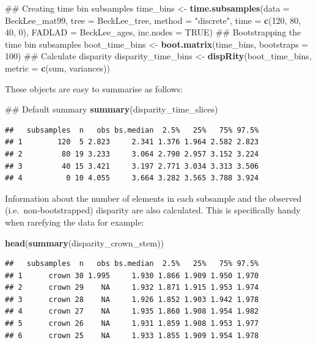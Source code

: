 \documentclass[]{book}
\newenvironment{Shaded}{\begin{snugshade}}{\end{snugshade}}
\newcommand{\KeywordTok}[1]{\textcolor[rgb]{0.13,0.29,0.53}{\textbf{#1}}}
\newcommand{\DataTypeTok}[1]{\textcolor[rgb]{0.13,0.29,0.53}{#1}}
\newcommand{\DecValTok}[1]{\textcolor[rgb]{0.00,0.00,0.81}{#1}}
\newcommand{\StringTok}[1]{\textcolor[rgb]{0.31,0.60,0.02}{#1}}
\newcommand{\OtherTok}[1]{\textcolor[rgb]{0.56,0.35,0.01}{#1}}
\newcommand{\NormalTok}[1]{#1}
\theoremstyle{definition}
\theoremstyle{definition}
\theoremstyle{remark}
\begin{document}
\begin{Shaded}
\begin{Highlighting}[]
\NormalTok{## Creating time bin subsamples}
\NormalTok{time_bins <-}\StringTok{ }\KeywordTok{time.subsamples}\NormalTok{(}\DataTypeTok{data =}\NormalTok{ BeckLee_mat99, }\DataTypeTok{tree =}\NormalTok{ BeckLee_tree, }
    \DataTypeTok{method =} \StringTok{"discrete"}\NormalTok{, }\DataTypeTok{time =} \KeywordTok{c}\NormalTok{(}\DecValTok{120}\NormalTok{, }\DecValTok{80}\NormalTok{, }\DecValTok{40}\NormalTok{, }\DecValTok{0}\NormalTok{), }\DataTypeTok{FADLAD =}\NormalTok{ BeckLee_ages,}
    \DataTypeTok{inc.nodes =} \OtherTok{TRUE}\NormalTok{)}
\NormalTok{## Bootstrapping the time bin subsamples}
\NormalTok{boot_time_bins <-}\StringTok{ }\KeywordTok{boot.matrix}\NormalTok{(time_bins, }\DataTypeTok{bootstraps =} \DecValTok{100}\NormalTok{)}
\NormalTok{## Calculate disparity}
\NormalTok{disparity_time_bins <-}\StringTok{ }\KeywordTok{dispRity}\NormalTok{(boot_time_bins, }\DataTypeTok{metric =} \KeywordTok{c}\NormalTok{(sum, variances))}
\end{Highlighting}
\end{Shaded}

These objects are easy to summarise as follows:

\begin{Shaded}
\begin{Highlighting}[]
\NormalTok{## Default summary}
\KeywordTok{summary}\NormalTok{(disparity_time_slices)}
\end{Highlighting}
\end{Shaded}

\begin{verbatim}
##   subsamples  n   obs bs.median  2.5%   25%   75% 97.5%
## 1        120  5 2.823     2.341 1.376 1.964 2.582 2.823
## 2         80 19 3.233     3.064 2.790 2.957 3.152 3.224
## 3         40 15 3.421     3.197 2.771 3.034 3.313 3.506
## 4          0 10 4.055     3.664 3.282 3.565 3.788 3.924
\end{verbatim}

Information about the number of elements in each subsample and the
observed (i.e.~non-bootstrapped) disparity are also calculated. This is
specifically handy when rarefying the data for example:

\begin{Shaded}
\begin{Highlighting}[]
\KeywordTok{head}\NormalTok{(}\KeywordTok{summary}\NormalTok{(disparity_crown_stem))}
\end{Highlighting}
\end{Shaded}

\begin{verbatim}
##   subsamples  n   obs bs.median  2.5%   25%   75% 97.5%
## 1      crown 30 1.995     1.930 1.866 1.909 1.950 1.970
## 2      crown 29    NA     1.932 1.871 1.915 1.953 1.974
## 3      crown 28    NA     1.926 1.852 1.903 1.942 1.978
## 4      crown 27    NA     1.935 1.860 1.908 1.954 1.982
## 5      crown 26    NA     1.931 1.859 1.908 1.953 1.977
## 6      crown 25    NA     1.933 1.855 1.909 1.954 1.978
\end{verbatim}
\end{document}

